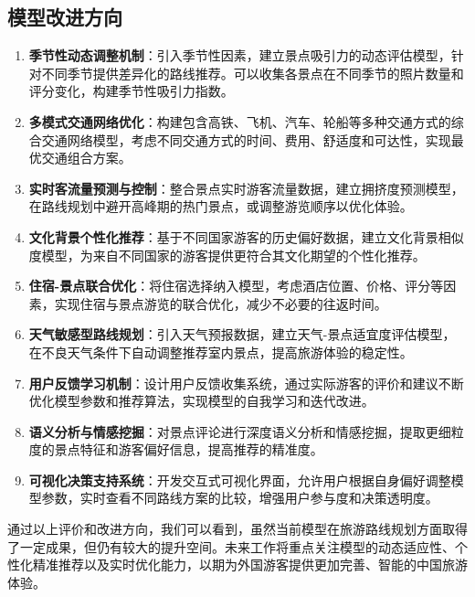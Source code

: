 \documentclass[withoutpreface,bwprint]{cumcmthesis} %
\begin{document}
\subsection{模型改进方向}
\begin{enumerate}
    \item \textbf{季节性动态调整机制}：引入季节性因素，建立景点吸引力的动态评估模型，针对不同季节提供差异化的路线推荐。可以收集各景点在不同季节的照片数量和评分变化，构建季节性吸引力指数。
    
    \item \textbf{多模式交通网络优化}：构建包含高铁、飞机、汽车、轮船等多种交通方式的综合交通网络模型，考虑不同交通方式的时间、费用、舒适度和可达性，实现最优交通组合方案。
    
    \item \textbf{实时客流量预测与控制}：整合景点实时游客流量数据，建立拥挤度预测模型，在路线规划中避开高峰期的热门景点，或调整游览顺序以优化体验。
    
    \item \textbf{文化背景个性化推荐}：基于不同国家游客的历史偏好数据，建立文化背景相似度模型，为来自不同国家的游客提供更符合其文化期望的个性化推荐。
    
    \item \textbf{住宿-景点联合优化}：将住宿选择纳入模型，考虑酒店位置、价格、评分等因素，实现住宿与景点游览的联合优化，减少不必要的往返时间。
    
    \item \textbf{天气敏感型路线规划}：引入天气预报数据，建立天气-景点适宜度评估模型，在不良天气条件下自动调整推荐室内景点，提高旅游体验的稳定性。
    
    \item \textbf{用户反馈学习机制}：设计用户反馈收集系统，通过实际游客的评价和建议不断优化模型参数和推荐算法，实现模型的自我学习和迭代改进。
    
    \item \textbf{语义分析与情感挖掘}：对景点评论进行深度语义分析和情感挖掘，提取更细粒度的景点特征和游客偏好信息，提高推荐的精准度。
    
    \item \textbf{可视化决策支持系统}：开发交互式可视化界面，允许用户根据自身偏好调整模型参数，实时查看不同路线方案的比较，增强用户参与度和决策透明度。
\end{enumerate}

通过以上评价和改进方向，我们可以看到，虽然当前模型在旅游路线规划方面取得了一定成果，但仍有较大的提升空间。未来工作将重点关注模型的动态适应性、个性化精准推荐以及实时优化能力，以期为外国游客提供更加完善、智能的中国旅游体验。
\end{document}
